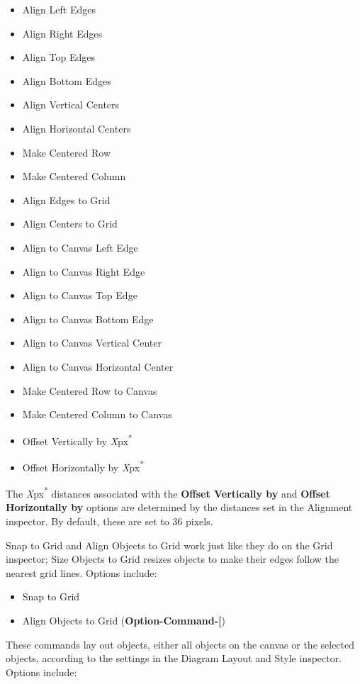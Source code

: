 \documentclass[../main.tex]{subfiles}
\begin{document}
\begin{description}[style=nextline]
    \begin{itemize}
      \item Align Left Edges
      \item Align Right Edges
      \item Align Top Edges
      \item Align Bottom Edges
      \item Align Vertical Centers
      \item Align Horizontal Centers
      \item Make Centered Row
      \item Make Centered Column
      \item Align Edges to Grid
      \item Align Centers to Grid
      \item Align to Canvas Left Edge
      \item Align to Canvas Right Edge
      \item Align to Canvas Top Edge
      \item Align to Canvas Bottom Edge
      \item Align to Canvas Vertical Center
      \item Align to Canvas Horizontal Center
      \item Make Centered Row to Canvas
      \item Make Centered Column to Canvas
      \item Offset Vertically by \textit{X}px\textsuperscript{*}
      \item Offset Horizontally by \textit{X}px\textsuperscript{*}
    \end{itemize}

    \begin{ognote}
      The \textit{X}px\textsuperscript{*} distances associated with the \textbf{Offset Vertically
      by} and \textbf{Offset Horizontally by} options are determined by the distances set in the
      Alignment inspector. By default, these are set to 36 pixels.
    \end{ognote}
  \item[{Grid}] Snap to Grid and Align Objects to Grid work just like they do on the Grid
    inspector; Size Objects to Grid resizes objects to make their edges follow the nearest grid
    lines. Options include:

    \begin{itemize}
      \item Snap to Grid
      \item Align Objects to Grid (\textbf{Option-Command-[})
      \end{itemize}
    \item[{Diagram Layout}] These commands lay out objects, either all objects on the canvas or
      the selected objects, according to the settings in the Diagram Layout and Style inspector.
      Options include:


\end{description}
\end{document}

